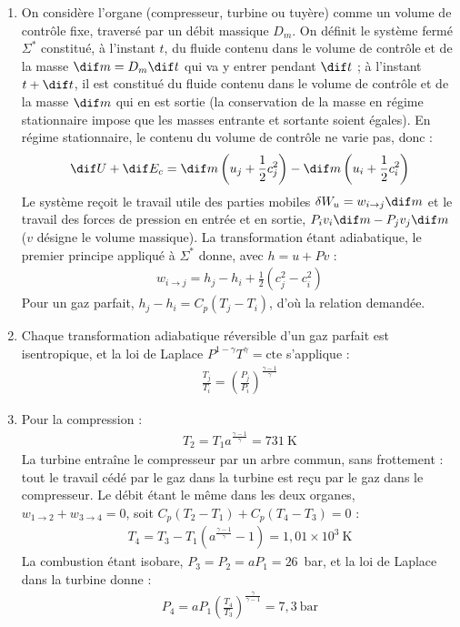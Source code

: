 \begin{correction}

\begin{enumerate}

	\item On considère l'organe (compresseur, turbine ou tuyère) comme un volume de contrôle fixe, traversé par un débit massique $D_m$. On définit le système fermé $\Sigma^\ast$ constitué, à l'instant $t$, du fluide contenu dans le volume de contrôle et de la masse $\dif m=D_m\dif t$ qui va y entrer pendant $\dif t$ ; à l'instant $t+\dif t$, il est constitué du fluide contenu dans le volume de contrôle et de la masse $\dif m$ qui en est sortie (la conservation de la masse en régime stationnaire impose que les masses entrante et sortante soient égales). En régime stationnaire, le contenu du volume de contrôle ne varie pas, donc :
	\begin{align*}
		\dif U+\dif E_c=\dif m\left(u_j+\frac{1}{2}c_j^2\right)-\dif m\left(u_i+\frac{1}{2}c_i^2\right)
	\end{align*}
	Le système reçoit le travail utile des parties mobiles $\delta W_u=w_{i\rightarrow j}\dif m$ et le travail des forces de pression en entrée et en sortie, $P_iv_i\dif m-P_jv_j\dif m$ ($v$ désigne le volume massique). La transformation étant adiabatique, le premier principe appliqué à $\Sigma^\ast$ donne, avec $h=u+Pv$ :
	\begin{align*}
		w_{i\rightarrow j}=h_j-h_i+\frac{1}{2}\left(c_j^2-c_i^2\right)
	\end{align*}
	Pour un gaz parfait, $h_j-h_i=C_p(T_j-T_i)$, d'où la relation demandée.

	\item Chaque transformation adiabatique réversible d'un gaz parfait est isentropique, et la loi de Laplace $P^{1-\gamma}T^\gamma=\text{cte}$ s'applique :
	\begin{align*}
		\boxed{\frac{T_j}{T_i}=\left(\frac{P_j}{P_i}\right)^{\frac{\gamma-1}{\gamma}}}
	\end{align*}

	\item Pour la compression :
	\begin{align*}
		\boxed{T_2=T_1a^{\frac{\gamma-1}{\gamma}}=731~\text{K}}
	\end{align*}
	La turbine entraîne le compresseur par un arbre commun, sans frottement : tout le travail cédé par le gaz dans la turbine est reçu par le gaz dans le compresseur. Le débit étant le même dans les deux organes, $w_{1\rightarrow2}+w_{3\rightarrow4}=0$, soit $C_p(T_2-T_1)+C_p(T_4-T_3)=0$ :
	\begin{align*}
		\boxed{T_4=T_3-T_1\left(a^{\frac{\gamma-1}{\gamma}}-1\right)=1{,}01\times10^{3}~\text{K}}
	\end{align*}
	La combustion étant isobare, $P_3=P_2=aP_1=26$~bar, et la loi de Laplace dans la turbine donne :
	\begin{align*}
		\boxed{P_4=aP_1\left(\frac{T_4}{T_3}\right)^{\frac{\gamma}{\gamma-1}}=7{,}3~\text{bar}}
	\end{align*}


\end{enumerate}
\end{correction}
